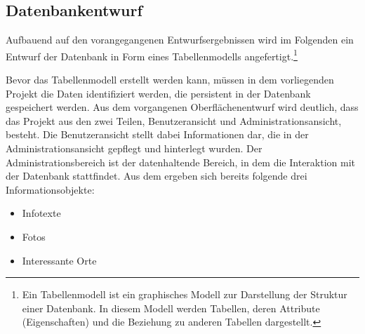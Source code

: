 \subsection{Datenbankentwurf}
\label{sec:Datenbankentwurf}

Aufbauend auf den vorangegangenen Entwurfsergebnissen wird im Folgenden ein
Entwurf der Datenbank in Form eines Tabellenmodells angefertigt.\footnote{Ein
Tabellenmodell ist ein graphisches Modell zur Darstellung der Struktur einer
Datenbank. In diesem Modell werden Tabellen, deren Attribute (Eigenschaften)
und die Beziehung zu anderen Tabellen dargestellt.}

Bevor das Tabellenmodell erstellt werden kann, müssen in dem vorliegenden
Projekt die Daten identifiziert werden, die persistent in der Datenbank
gespeichert werden. Aus dem vorgangenen Oberflächenentwurf wird deutlich, dass
das Projekt aus den zwei Teilen, Benutzeransicht und Administrationsansicht,
besteht. Die Benutzeransicht stellt dabei Informationen dar, die in der
Administrationsansicht gepflegt und hinterlegt wurden. Der
Administrationsbereich ist der datenhaltende Bereich, in dem die Interaktion
mit der Datenbank stattfindet. Aus dem  ergeben
sich bereits folgende drei Informationsobjekte:

\begin{itemize}
  \item Infotexte
  \item Fotos
  \item Interessante Orte
\end{itemize}


